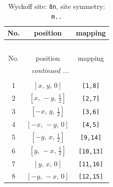 \documentclass[fleqn,8pt]{jsarticle}
\begin{document}
\begin{longtable}{ccc}
\caption{Wyckoff site: {\tt 8n}, site symmetry: {\tt m..}}
 \\
 \hline \hline
No. & position & mapping \\ \hline \endfirsthead

\multicolumn{2}{l}{\tablename\ \thetable{}} \\
 \hline \hline
No. & position & mapping \\ \hline \endhead

 \hline \hline
\multicolumn{2}{r}{\footnotesize\it continued ...} \\ \endfoot

 \hline \hline
\multicolumn{2}{r}{} \\ \endlastfoot

1 & $\left[ x,\, y,\, 0 \right]$ & {\tt [1,8]} \\ \hline
2 & $\left[ x,\, - y,\, \frac{1}{2} \right]$ & {\tt [2,7]} \\ \hline
3 & $\left[ - x,\, y,\, \frac{1}{2} \right]$ & {\tt [3,6]} \\ \hline
4 & $\left[ - x,\, - y,\, 0 \right]$ & {\tt [4,5]} \\ \hline
5 & $\left[ - y,\, x,\, \frac{1}{2} \right]$ & {\tt [9,14]} \\ \hline
6 & $\left[ y,\, - x,\, \frac{1}{2} \right]$ & {\tt [10,13]} \\ \hline
7 & $\left[ y,\, x,\, 0 \right]$ & {\tt [11,16]} \\ \hline
8 & $\left[ - y,\, - x,\, 0 \right]$ & {\tt [12,15]} \\
\end{longtable}
\renewcommand{\arraystretch}{1.2}
\end{document}
